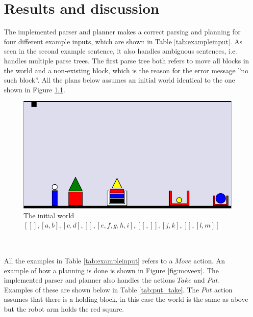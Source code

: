 \chapter{Results and discussion}
The implemented parser and planner makes a correct parsing and planning for
four different example inputs, which are shown in Table \ref{tab:exampleinput}. 
As seen in the second example sentence, it
also handles ambiguous sentences, i.e. handles multiple parse trees. The first
parse tree both refers to move all blocks in the world and a non-existing
block, which is the reason for the error message ''no such block''. All the
plans below assumes an initial world identical to the one shown in 
Figure \ref{fig:initworld}.\\
\begin{figure}[h!]
\centering
\includegraphics[scale = 0.5]{fig/1.png}
\caption{The initial world\\ $[[],[a,b],[c,d], [], [e,f,g,h,i],[],[],[j,k], [], [l,m]]$}
\label{fig:initworld}
\end{figure}\\\\
All the examples in Table \ref{tab:exampleinput} refers to a $Move$ action. An example of how a
planning is done is shown in Figure \ref{fig:moveex}. The implemented parser
and planner also handles the actions $Take$ and $Put$. Examples of these are
shown below in Table \ref{tab:put_take}. The $Put$ action assumes that there is
a holding block, in this case the world is the same as above but the robot arm 
holds the red square.
